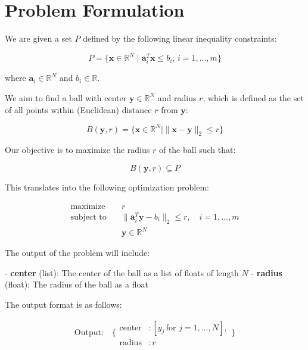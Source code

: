 \documentclass{article}
\begin{document}
\section*{Problem Formulation}

We are given a set \( P \) defined by the following linear inequality constraints:

\[
P = \{ \mathbf{x} \in \mathbb{R}^N \mid \mathbf{a}_i^T \mathbf{x} \leq b_i, \, i = 1, \ldots, m \}
\]

where \( \mathbf{a}_i \in \mathbb{R}^N \) and \( b_i \in \mathbb{R} \).

We aim to find a ball with center \( \mathbf{y} \in \mathbb{R}^N \) and radius \( r \), which is defined as the set of all points within (Euclidean) distance \( r \) from \( \mathbf{y} \):

\[
B(\mathbf{y}, r) = \{ \mathbf{x} \in \mathbb{R}^N \mid \| \mathbf{x} - \mathbf{y} \|_2 \leq r \}
\]

Our objective is to maximize the radius \( r \) of the ball such that:

\[
B(\mathbf{y}, r) \subseteq P
\]

This translates into the following optimization problem:

\begin{align*}
\text{maximize} & \quad r \\
\text{subject to} & \quad \| \mathbf{a}_i^T \mathbf{y} - b_i \|_2 \leq r, \quad i = 1, \ldots, m \\
                  & \quad \mathbf{y} \in \mathbb{R}^N
\end{align*}

The output of the problem will include:

- \textbf{center} (list): The center of the ball as a list of floats of length \( N \)
- \textbf{radius} (float): The radius of the ball as a float

The output format is as follows:

\[
\text{Output:} \quad \{
\begin{align*}
\text{center} & : [y_j \, \text{for } j = 1, \ldots, N], \\
\text{radius} & : r
\end{align*}
\}
\]
\end{document}
